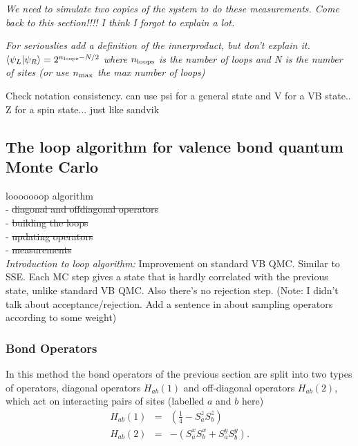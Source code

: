 \documentclass[prb,aps,twocolumn,floatfix,amsmath,amssymb,superscriptaddress,tightenlines]{revtex4}
\begin{document}
{\it We need to simulate two copies of the system to do these measurements.  
Come back to this section!!!!  I think I forgot to explain a lot. }

{\it For seriouslies add a definition of the innerproduct, but don't explain it.  
$\langle \psi_L \rvert \psi_R \rangle = 2^{n_{\rm loops} - N/2}$ where $n_{\rm loops}$ is the number
of loops and N is the number of sites  (or use $n_{\rm max}$ the max number of loops)

Check notation consistency.  can use psi for a general state and V for a VB state.. Z for a spin state... just like sandvik
}

\subsection{The loop algorithm for valence bond quantum Monte Carlo}

looooooop algorithm \\
- \sout{ diagonal and offdiagonal operators}\\
- \sout{building the loops} \\
- \sout{updating operators} \\
- \sout{measurements} \\

{\it Introduction to loop algorithm:}
Improvement on standard VB QMC.  Similar to SSE.  Each MC step gives a state that is hardly correlated with the previous state, unlike standard VB QMC.  Also there's no rejection step.  (Note: I didn't talk about acceptance/rejection.  Add a sentence in about sampling operators according to some weight)

\subsubsection{Bond Operators}

In this method the bond operators of the previous section are split into two types of  operators, diagonal operators $H_{ab}(1)$ and off-diagonal operators $H_{ab}(2)$, which act on interacting pairs of sites (labelled $a$ and $b$ here)
\begin{eqnarray}
	H_{ab}(1) &=&(\tfrac{1}{4} - S^z_aS^z_b) \\
	H_{ab}(2) &=& -(S_a^xS_b^x + S_a^yS_b^y). 
\end{eqnarray}
\end{document}
